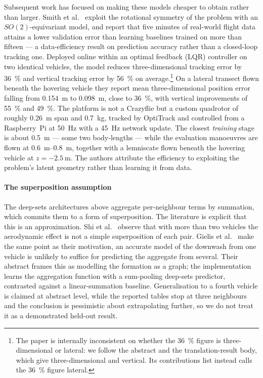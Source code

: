 Subsequent work has focused on making these models cheaper to obtain rather than larger. Smith et
al.~\cite{smith2023so2equivariant} exploit the rotational symmetry of the problem with an
$SO(2)$-equivariant model, and report that five minutes of real-world flight data attains a lower
validation error than learning baselines trained on more than fifteen --- a data-efficiency result
on prediction accuracy rather than a closed-loop tracking one. Deployed online within an optimal
feedback (LQR) controller on two identical vehicles, the model reduces three-dimensional tracking
error by \SI{36}{\percent} and vertical tracking error by \SI{56}{\percent} on
average.\footnote{The paper is internally inconsistent on whether the \SI{36}{\percent} figure is
three-dimensional or lateral: we follow the abstract and the translation-result body, which give
three-dimensional and vertical. Its contributions list instead calls the \SI{36}{\percent} figure
lateral.} On a lateral transect flown beneath the hovering vehicle they report mean
three-dimensional position error falling from \SI{0.154}{\metre} to \SI{0.098}{\metre}, close to
\SI{36}{\percent}, with vertical improvements of \SI{55}{\percent} and \SI{49}{\percent}. The
platform is not a Crazyflie but a custom quadrotor of roughly \SI{0.26}{\metre} span and
\SI{0.7}{\kilo\gram}, tracked by OptiTrack and controlled from a Raspberry~Pi at \SI{50}{\hertz}
with a \SI{45}{\hertz} network update. The closest \emph{training} stage is about
\SI{0.5}{\metre} --- some two body-lengths --- while the evaluation manoeuvres are flown at
\SIrange{0.6}{0.8}{\metre}, together with a lemniscate flown beneath the hovering vehicle at
\(z = \SI{-2.5}{\metre}\). The authors
attribute the efficiency to exploiting the problem's latent geometry rather than learning it from
data.

\label{sec:rw-superposition}
\paragraph{The superposition assumption}

The deep-sets architectures above aggregate per-neighbour terms by summation, which commits them
to a form of superposition. The literature is explicit that this is an approximation.
Shi et al.~\cite{shi2020neuralswarm} observe that with more than two vehicles the aerodynamic
effect is not a simple superposition of each pair. Gielis et al.~\cite{gielis2023aggregate} make
the same point as their motivation, an accurate model of the downwash from one vehicle is
unlikely to suffice for predicting the aggregate from several. Their abstract frames this as
modelling the formation as a graph; the implementation learns the aggregation function with a
sum-pooling deep-sets predictor, contrasted against a linear-summation baseline. Generalisation to
a fourth vehicle is claimed at abstract level, while the reported tables stop at three neighbours
and the conclusion is pessimistic about extrapolating further, so we do not treat it as a
demonstrated held-out result.

